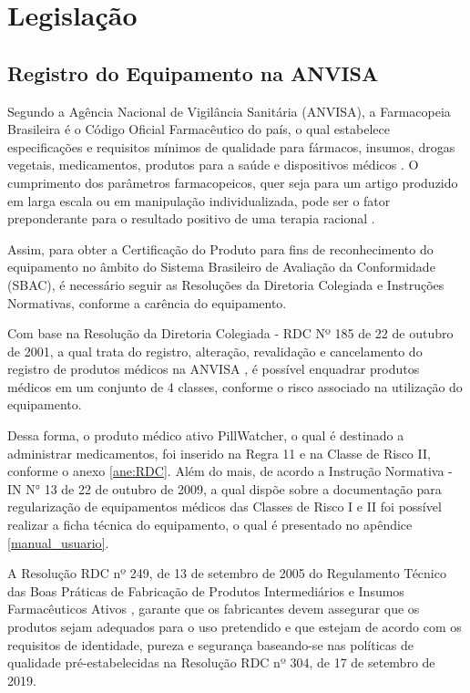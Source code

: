 \chapter[Legislação]{Legislação}

\section{Registro do Equipamento na ANVISA}

Segundo a Agência Nacional de Vigilância Sanitária (ANVISA), a Farmacopeia Brasileira é o Código Oficial Farmacêutico do país, o qual estabelece especificações e requisitos mínimos de qualidade para fármacos, insumos, drogas vegetais, medicamentos, produtos para a saúde e dispositivos médicos \cite{farmacopeia}. O cumprimento dos parâmetros farmacopeicos, quer seja para um artigo produzido em larga escala ou em manipulação individualizada, pode ser o fator preponderante para o resultado positivo de uma terapia racional \cite{Pianetti_2016}.

Assim, para obter a Certificação do Produto para fins de reconhecimento do equipamento no âmbito do Sistema Brasileiro de Avaliação da Conformidade (SBAC), é necessário seguir as Resoluções da Diretoria Colegiada e Instruções Normativas, conforme a carência do equipamento.

Com base na Resolução da Diretoria Colegiada - RDC  Nº 185 de 22 de outubro de 2001, a qual trata do registro, alteração, revalidação e cancelamento do registro de produtos médicos na ANVISA \cite{RDC_185}, é possível enquadrar produtos médicos em um conjunto de 4 classes, conforme o risco associado na utilização do equipamento.

Dessa forma, o produto médico ativo PillWatcher, o qual é  destinado a administrar medicamentos, foi inserido na Regra 11 e na Classe de Risco II, conforme o anexo \ref{ane:RDC}. Além do mais, de acordo a Instrução Normativa - IN N° 13 de 22 de outubro de 2009, a qual dispõe sobre a documentação para regularização de equipamentos médicos das Classes de Risco I e II foi possível realizar a ficha técnica do equipamento, o qual é presentado no apêndice \ref{manual_usuario}.

A Resolução RDC nº 249, de 13 de setembro de 2005 do Regulamento Técnico das Boas Práticas de Fabricação de Produtos Intermediários e Insumos Farmacêuticos Ativos \cite{RDC_249}, garante que os fabricantes devem assegurar que os produtos sejam adequados para o uso pretendido e que estejam de acordo com os requisitos de identidade, pureza e segurança baseando-se nas políticas de qualidade pré-estabelecidas na Resolução RDC nº 304, de 17 de setembro de 2019.

